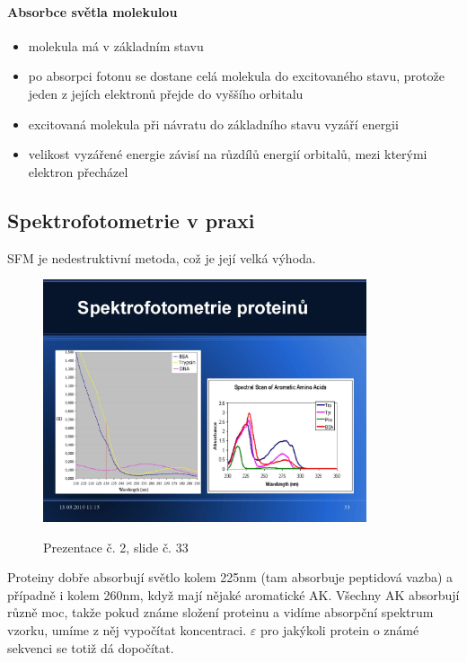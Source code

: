 \documentclass[DIV=8]{scrreprt}
\begin{document}
\paragraph{Absorbce světla molekulou}
\begin{itemize}[nosep]
    \item molekula má v základním stavu
    \item po absorpci fotonu se dostane celá molekula do excitovaného stavu, protože jeden z jejích elektronů přejde do vyššího orbitalu
    \item excitovaná molekula při návratu do základního stavu vyzáří energii
    \item velikost vyzářené energie závisí na růzdílů energií orbitalů, mezi kterými elektron přecházel
\end{itemize}



\subsection{Spektrofotometrie v praxi} \label{Spektrofotometrie v praxi}


SFM je nedestruktivní metoda, což je její velká výhoda.

\begin{figure}
    \caption{Prezentace č. 2, slide č. 33}
    \includegraphics[width=0.85\textwidth]{slides-2/slide-33.jpg}
    \centering
    \label{slides-2-slide-33}
\end{figure}

Proteiny dobře absorbují světlo kolem 225nm (tam absorbuje peptidová vazba) a případně i kolem 260nm, když mají nějaké aromatické AK. Všechny AK absorbují různě moc, takže pokud známe složení proteinu a vidíme absorpční spektrum vzorku, umíme z něj vypočítat koncentraci. \(\varepsilon\) pro jakýkoli protein o známé sekvenci se totiž dá dopočítat.
\end{document}
